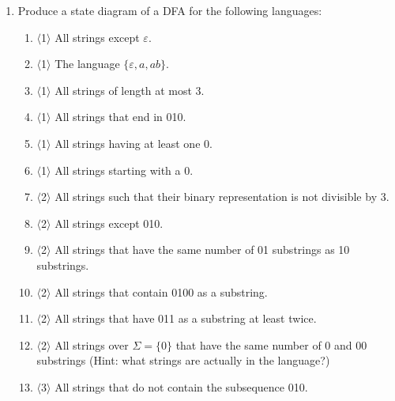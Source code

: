 \documentclass[]{article}
\newcommand{\Level}[1]{{\color{blue} $\langle$#1$\rangle$}}
\begin{document}
\pagebreak

\tableofcontents

\pagebreak

\begin{enumerate}

\section{DFAs}

\item Produce a state diagram of a DFA for the following languages:
\begin{enumerate}

\item \Level{1} All strings except $\varepsilon$.

\item \Level{1} The language $\{\varepsilon, a, ab\}$.

\item \Level{1} All strings of length at most 3.

\item \Level{1} All strings that end in 010.

\item \label{ex2017prod1} \Level{1} All strings having at least one 0.

\item \label{ex2017fprod1} \Level{1} All strings starting with a 0.

\item \label{ex2017prod2} \Level{2} All strings such that their binary representation is not divisible by 3.

\item \Level{2} All strings except 010.

\item \Level{2} All strings that have the same number of 01 substrings as 10 substrings.

\item \Level{2} All strings that contain 0100 as a substring.

\item \Level{2} All strings that have 011 as a substring at least twice.

\item \Level{2} All strings over $\Sigma = \{0\}$ that have the same number of 0 and 00 substrings (Hint: what strings are actually in the language?)

\item \label{ex2017fprod2} \Level{3}  All strings that do not contain the subsequence 010.


\end{enumerate}
\end{enumerate}
\end{document}
